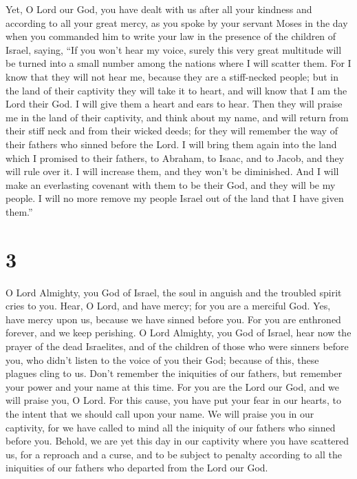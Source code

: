  Yet, O Lord our God, you have dealt with us after all
your kindness and according to all your great mercy,  as
you spoke by your servant Moses in the day when you commanded him to
write your law in the presence of the children of Israel, saying,
 ``If you won't hear my voice, surely this very great
multitude will be turned into a small number among the nations where I
will scatter them.  For I know that they will not hear
me, because they are a stiff-necked people; but in the land of their
captivity they will take it to heart,  and will know that
I am the Lord their God. I will give them a heart and ears to hear.
 Then they will praise me in the land of their captivity,
and think about my name,  and will return from their
stiff neck and from their wicked deeds; for they will remember the way
of their fathers who sinned before the Lord.  I will
bring them again into the land which I promised to their fathers, to
Abraham, to Isaac, and to Jacob, and they will rule over it. I will
increase them, and they won't be diminished.  And I will
make an everlasting covenant with them to be their God, and they will be
my people. I will no more remove my people Israel out of the land that I
have given them.''

\hypertarget{section-2}{%
\section{3}\label{section-2}}

 O Lord Almighty, you God of Israel, the soul in anguish
and the troubled spirit cries to you.  Hear, O Lord, and
have mercy; for you are a merciful God. Yes, have mercy upon us, because
we have sinned before you.  For you are enthroned forever,
and we keep perishing.  O Lord Almighty, you God of
Israel, hear now the prayer of the dead Israelites, and of the children
of those who were sinners before you, who didn't listen to the voice of
you their God; because of this, these plagues cling to us.
 Don't remember the iniquities of our fathers, but
remember your power and your name at this time.  For you
are the Lord our God, and we will praise you, O Lord.  For
this cause, you have put your fear in our hearts, to the intent that we
should call upon your name. We will praise you in our captivity, for we
have called to mind all the iniquity of our fathers who sinned before
you.  Behold, we are yet this day in our captivity where
you have scattered us, for a reproach and a curse, and to be subject to
penalty according to all the iniquities of our fathers who departed from
the Lord our God.

